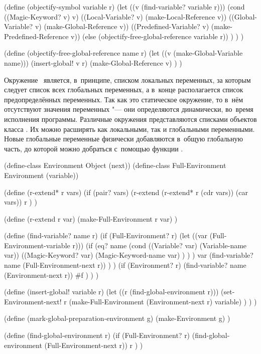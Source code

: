 \begin{code:lisp}
(define (objectify-symbol variable r)
  (let ((v (find-variable? variable r)))
    (cond ((Magic-Keyword? v)       v)
          ((Local-Variable? v)      (make-Local-Reference v))
          ((Global-Variable? v)     (make-Global-Reference v))
          ((Predefined-Variable? v) (make-Predefined-Reference v))
          (else (objectify-free-global-reference variable r)) ) ) )

(define (objectify-free-global-reference name r)
  (let ((v (make-Global-Variable name)))
    (insert-global! v r)
    (make-Global-Reference v) ) )
\end{code:lisp}

Окружение~ является, в~принципе, списком локальных переменных, за которым
следует список всех глобальных переменных, а в~конце располагается список
предопределённых переменных. Так как это статическое окружение, то в~нём
отсутствуют значения переменных "--- они определяются динамически, во~время
исполнения программы. Различные окружения представляются списками объектов
класса . Их можно расширять как локальными, так и глобальными
переменными. Новые глобальные переменные физически добавляются в~общую
глобальную часть, до которой можно добраться с~помощью функции
.

\begin{code:lisp}
(define-class Environment      Object (next))
(define-class Full-Environment Environment (variable))

(define (r-extend* r vars)
  (if (pair? vars) (r-extend (r-extend* r (cdr vars)) (car vars))
                   r ) )

(define (r-extend r var)
  (make-Full-Environment r var) )

(define (find-variable? name r)
  (if (Full-Environment? r)
      (let ((var (Full-Environment-variable r)))
        (if (eq? name (cond ((Variable? var)
                             (Variable-name var))
                            ((Magic-Keyword? var)
                             (Magic-Keyword-name var) ) ) )
            var
            (find-variable? name (Full-Environment-next r)) ) )
      (if (Environment? r)
          (find-variable? name (Environment-next r))
          #f ) ) )

(define (insert-global! variable r)
  (let ((r (find-global-environment r)))
    (set-Environment-next!
     r (make-Full-Environment (Environment-next r) variable) ) ) )

(define (mark-global-preparation-environment g)
  (make-Environment g) )

(define (find-global-environment r)
  (if (Full-Environment? r)
      (find-global-environment (Full-Environment-next r))
      r ) )
\end{code:lisp}

